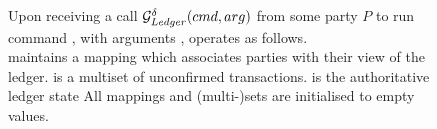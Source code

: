 \begin{figure}[ht]
  \begin{framed}
    \begin{minipage}[t]{\textwidth}
      \textrm{Upon receiving a call $\mathcal{G}_{Ledger}^\delta(cmd,arg)$ from
        some party $P$ to run command \cmd, with arguments \arg,
        \IdealGdledger operates as follows.} \\
      \textrm{\IdealGdledger maintains a mapping \ldgMap which associates
        parties with their view of the ledger.
        \ldgUtxo is a multiset of unconfirmed transactions.
        \ldgState is the authoritative ledger state
        All mappings and (multi-)sets are initialised to empty values.
      }
    \end{minipage}
    \vspace*{0.5em}


\end{framed}
\end{figure}
